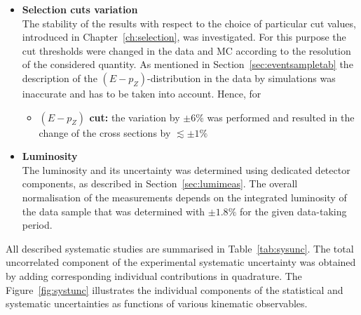 \begin{itemize}
	\item \textbf{Selection cuts variation} \\
		The stability of the results with respect to the choice of particular cut values, introduced in Chapter~\ref{ch:selection}, was investigated. For this purpose the cut thresholds were changed in the data and MC according to the resolution of the considered quantity. As mentioned in Section~\ref{sec:eventsampletab} the description of the $\left(E-p_Z\right)$-distribution in the data by simulations was inaccurate and has to be taken into account. Hence, for 
		\begin{itemize}
			\item \textbf{$\left( E-p_Z\right) $ cut:} the variation by $\pm6\%$ was performed and resulted in the change of the cross sections by $\lesssim \pm 1\%$
		\end{itemize}
	\item \textbf{Luminosity} \\
		The luminosity and its uncertainty was determined using dedicated detector components, as described in Section~\ref{sec:lumimeas}. The overall normalisation of the measurements depends on the integrated luminosity of the data sample that was determined with $\pm1.8\%$ for the given data-taking period.
\end{itemize}
All described systematic studies are summarised in Table~\ref{tab:sysunc}. The total uncorrelated component of the experimental systematic uncertainty was obtained by adding corresponding individual contributions in quadrature. The Figure~\ref{fig:systunc} illustrates the individual components of the statistical and systematic uncertainties as functions of various kinematic observables.
